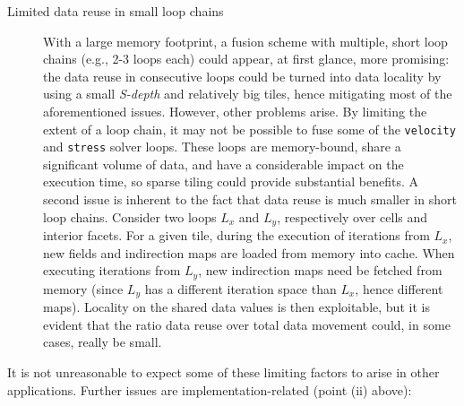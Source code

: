 \begin{description}
\item[Limited data reuse in small loop chains] With a large memory footprint, a fusion scheme with multiple, short loop chains (e.g., 2-3 loops each) could appear, at first glance, more promising: the data reuse in consecutive loops could be turned into data locality by using a small {\em S-depth} and relatively big tiles, hence mitigating most of the aforementioned issues. However, other problems arise. By limiting the extent of a loop chain, it may not be possible to fuse some of the {\tt velocity} and {\tt stress} solver loops. These loops are memory-bound, share a significant volume of data, and have a considerable impact on the execution time, so sparse tiling could provide substantial benefits. A second issue is inherent to the fact that data reuse is much smaller in short loop chains. Consider two loops $L_x$ and $L_y$, respectively over cells and interior facets. For a given tile, during the execution of iterations from $L_x$, new fields and indirection maps are loaded from memory into cache. When executing iterations from $L_y$, new indirection maps need be fetched from memory (since $L_y$ has a different iteration space than $L_x$, hence different maps). Locality on the shared data values is then exploitable, but it is evident that the ratio data reuse over total data movement could, in some cases, really be small.
\end{description}

It is not unreasonable to expect some of these limiting factors to arise in other applications. Further issues are implementation-related (point (ii) above):

